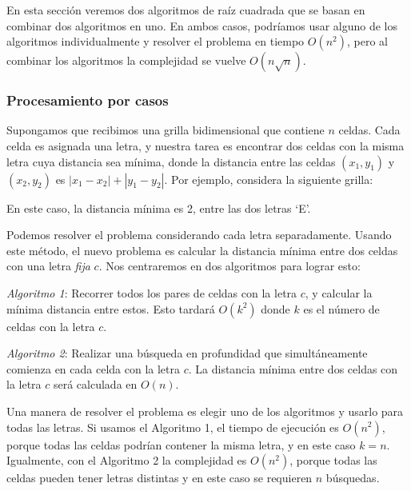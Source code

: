 En esta sección veremos dos algoritmos de raíz cuadrada que se basan en
combinar dos algoritmos en uno. En ambos casos, podríamos usar alguno
de los algoritmos individualmente y resolver el problema en tiempo $O(n^2)$,
pero al combinar los algoritmos la complejidad se vuelve $O(n \sqrt n)$.

\subsubsection{Procesamiento por casos}

Supongamos que recibimos una grilla bidimensional que contiene $n$ celdas.
Cada celda es asignada una letra, y nuestra tarea es encontrar dos celdas
con la misma letra cuya distancia sea mínima, donde la distancia entre las
celdas $(x_1,y_1)$ y $(x_2,y_2)$ es $|x_1-x_2|+|y_1-y_2|$. Por ejemplo,
considera la siguiente grilla:

\begin{center}
\end{center}
En este caso, la distancia mínima es 2, entre las dos letras `E'.

Podemos resolver el problema considerando cada letra separadamente.
Usando este método, el nuevo problema es calcular la distancia mínima
entre dos celdas con una letra \emph{fija} $c$. Nos centraremos en dos
algoritmos para lograr esto:

\emph{Algoritmo 1}: Recorrer todos los pares de celdas con la letra $c$,
y calcular la mínima distancia entre estos. Esto tardará $O(k^2)$ donde
$k$ es el número de celdas con la letra $c$.

\emph{Algoritmo 2}: Realizar una búsqueda en profundidad que
simultáneamente comienza en cada celda con la letra $c$. La distancia
mínima entre dos celdas con la letra $c$ será calculada en $O(n)$.

Una manera de resolver el problema es elegir uno de los algoritmos y
usarlo para todas las letras. Si usamos el Algoritmo 1, el tiempo de
ejecución es $O(n^2)$, porque todas las celdas podrían contener la misma
letra, y en este caso $k=n$. Igualmente, con el Algoritmo 2 la complejidad
es $O(n^2)$, porque todas las celdas pueden tener letras distintas y en
este caso se requieren $n$ búsquedas.


